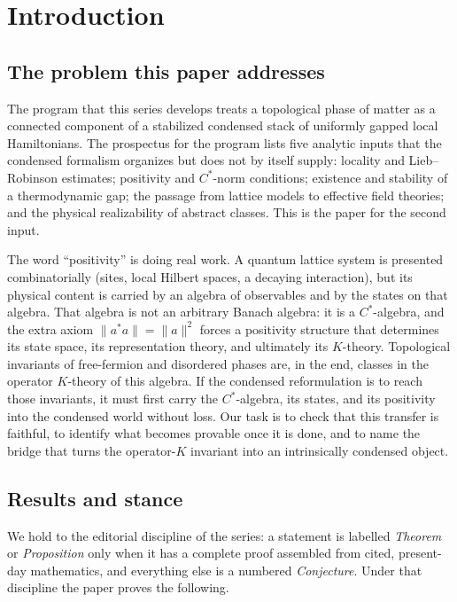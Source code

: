 \documentclass[12pt]{article}
\newcommand{\norm}[1]{\lVert #1 \rVert}
\theoremstyle{plain}
\begin{document}
\section{Introduction}
\label{sec:intro}

\subsection{The problem this paper addresses}

The program that this series develops treats a topological phase of matter as a
connected component of a stabilized condensed stack of uniformly gapped local
Hamiltonians. The prospectus for the program lists five analytic inputs that the
condensed formalism organizes but does not by itself supply: locality and
Lieb--Robinson estimates; positivity and $C^{*}$-norm conditions; existence and
stability of a thermodynamic gap; the passage from lattice models to effective
field theories; and the physical realizability of abstract classes. This is the
paper for the second input.

The word ``positivity'' is doing real work. A quantum lattice system is presented
combinatorially (sites, local Hilbert spaces, a decaying interaction), but its
physical content is carried by an algebra of observables and by the states on that
algebra. That algebra is not an arbitrary Banach algebra: it is a $C^{*}$-algebra,
and the extra axiom $\norm{a^{*}a}=\norm{a}^{2}$ forces a positivity structure that
determines its state space, its representation theory, and ultimately its
$K$-theory. Topological invariants of free-fermion and disordered phases are, in the
end, classes in the operator $K$-theory of this algebra. If the condensed
reformulation is to reach those invariants, it must first carry the $C^{*}$-algebra,
its states, and its positivity into the condensed world without loss. Our task is
to check that this transfer is faithful, to identify what becomes provable once it
is done, and to name the bridge that turns the operator-$K$ invariant into an
intrinsically condensed object.

\subsection{Results and stance}

We hold to the editorial discipline of the series: a statement is labelled
\emph{Theorem} or \emph{Proposition} only when it has a complete proof assembled
from cited, present-day mathematics, and everything else is a numbered
\emph{Conjecture}. Under that discipline the paper proves the following.
\end{document}
